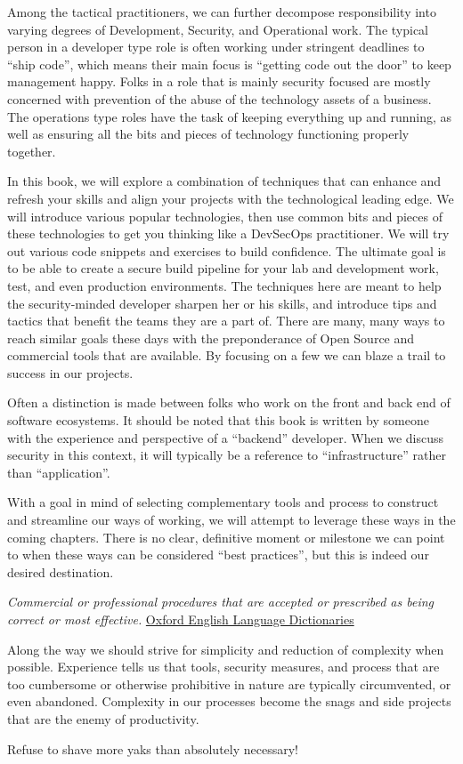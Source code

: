 \justifying
Among the tactical practitioners, we can further decompose responsibility into
varying degrees of Development, Security, and Operational work. The typical
person in a developer type role is often working under stringent deadlines to
``ship code'', which means their main focus is ``getting code out the door'' to
keep management happy. Folks in a role that is mainly security focused are mostly
concerned with prevention of the abuse of the technology assets of a business. The
operations type roles have the task of keeping everything up and running, as well as
ensuring all the bits and pieces of technology functioning properly together.

\justifying
In this book, we will explore a combination of techniques that can enhance and refresh
your skills and align your projects with the technological leading edge. We will
introduce various popular technologies, then use common bits and pieces of
these technologies to get you thinking like a DevSecOps practitioner. We will try out
various code snippets and exercises to build confidence. The ultimate goal is to be able to
create a secure build pipeline for your lab and development work,
test, and even production environments. The techniques here are meant to help
the security-minded developer sharpen her or his skills, and introduce tips
and tactics that benefit the teams they are a part of. There are many, many
ways to reach similar goals these days with the preponderance of Open Source
and commercial tools that are available. By focusing on a few we can blaze a
trail to success in our projects.

\justifying
Often a distinction is made between folks
who work on the front and back end of software ecosystems. It should be noted that this
book is written by someone with the
experience and perspective of a ``backend'' developer. When we discuss security in this context,
it will typically be a reference to ``infrastructure'' rather than ``application''.

\justifying
With a goal in mind of selecting complementary tools and process to construct
and streamline our ways of working, we will attempt to leverage these ways in the coming chapters.
There is no clear, definitive moment or milestone we can point to when these ways can be considered
``best practices'', but this is indeed our desired destination.

\begin{displayquote}
\emph{Commercial or professional procedures that are accepted or prescribed as being correct or most effective.}
\href{https://www.oxfordlearnersdictionaries.com/definition/american_english/best-practice}{Oxford English Language Dictionaries}
\end{displayquote}


Along the way we should strive for simplicity and reduction of complexity when possible.
Experience tells us that tools, security measures, and process that are too cumbersome
or otherwise prohibitive in nature are typically circumvented, or even abandoned.
Complexity in our processes become the snags and side projects that are the
enemy of productivity.

\justifying
Refuse to shave more yaks\cite{yak} than absolutely necessary!
